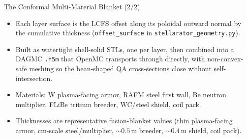 \documentclass[11pt,aspectratio=169]{beamer}
\begin{document}
\begin{frame}{The Conformal Multi-Material Blanket (2/2)}
\footnotesize
\begin{itemize}
\item Each layer surface is the LCFS offset along its poloidal outward normal by the
      cumulative thickness (\texttt{offset\_surface} in \texttt{stellarator\_geometry.py}).
\item Built as watertight shell-solid STLs, one per layer, then combined into a DAGMC
      \texttt{.h5m} that OpenMC transports through directly, with non-convex-safe meshing
      so the bean-shaped QA cross-sections close without self-intersection.
\item Materials: W plasma-facing armor, RAFM steel first wall, Be neutron multiplier,
      FLiBe tritium breeder, WC/steel shield, coil pack.
\item Thicknesses are representative fusion-blanket values (thin plasma-facing armor,
      cm-scale steel/multiplier, $\sim\!0.5$\,m breeder, $\sim\!0.4$\,m shield, coil
      pack).
\end{itemize}
\end{frame}
\end{document}
